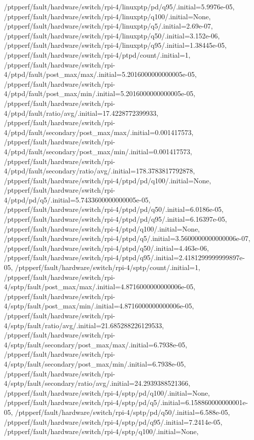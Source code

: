 {    /ptpperf/fault/hardware/switch/rpi-4/linuxptp/pd/q95/.initial=5.9976e-05,
    /ptpperf/fault/hardware/switch/rpi-4/linuxptp/q100/.initial=None,
    /ptpperf/fault/hardware/switch/rpi-4/linuxptp/q5/.initial=2.69e-07,
    /ptpperf/fault/hardware/switch/rpi-4/linuxptp/q50/.initial=3.152e-06,
    /ptpperf/fault/hardware/switch/rpi-4/linuxptp/q95/.initial=1.38445e-05,
    /ptpperf/fault/hardware/switch/rpi-4/ptpd/count/.initial=1,
    /ptpperf/fault/hardware/switch/rpi-4/ptpd/fault/post_max/max/.initial=5.2016000000000005e-05,
    /ptpperf/fault/hardware/switch/rpi-4/ptpd/fault/post_max/min/.initial=5.2016000000000005e-05,
    /ptpperf/fault/hardware/switch/rpi-4/ptpd/fault/ratio/avg/.initial=17.4228772399933,
    /ptpperf/fault/hardware/switch/rpi-4/ptpd/fault/secondary/post_max/max/.initial=0.001417573,
    /ptpperf/fault/hardware/switch/rpi-4/ptpd/fault/secondary/post_max/min/.initial=0.001417573,
    /ptpperf/fault/hardware/switch/rpi-4/ptpd/fault/secondary/ratio/avg/.initial=178.3783817792878,
    /ptpperf/fault/hardware/switch/rpi-4/ptpd/pd/q100/.initial=None,
    /ptpperf/fault/hardware/switch/rpi-4/ptpd/pd/q5/.initial=5.7433600000000005e-05,
    /ptpperf/fault/hardware/switch/rpi-4/ptpd/pd/q50/.initial=6.0186e-05,
    /ptpperf/fault/hardware/switch/rpi-4/ptpd/pd/q95/.initial=6.16397e-05,
    /ptpperf/fault/hardware/switch/rpi-4/ptpd/q100/.initial=None,
    /ptpperf/fault/hardware/switch/rpi-4/ptpd/q5/.initial=3.5600000000000006e-07,
    /ptpperf/fault/hardware/switch/rpi-4/ptpd/q50/.initial=4.463e-06,
    /ptpperf/fault/hardware/switch/rpi-4/ptpd/q95/.initial=2.4181299999999897e-05,
    /ptpperf/fault/hardware/switch/rpi-4/sptp/count/.initial=1,
    /ptpperf/fault/hardware/switch/rpi-4/sptp/fault/post_max/max/.initial=4.8716000000000006e-05,
    /ptpperf/fault/hardware/switch/rpi-4/sptp/fault/post_max/min/.initial=4.8716000000000006e-05,
    /ptpperf/fault/hardware/switch/rpi-4/sptp/fault/ratio/avg/.initial=21.685288226129533,
    /ptpperf/fault/hardware/switch/rpi-4/sptp/fault/secondary/post_max/max/.initial=6.7938e-05,
    /ptpperf/fault/hardware/switch/rpi-4/sptp/fault/secondary/post_max/min/.initial=6.7938e-05,
    /ptpperf/fault/hardware/switch/rpi-4/sptp/fault/secondary/ratio/avg/.initial=24.2939388521366,
    /ptpperf/fault/hardware/switch/rpi-4/sptp/pd/q100/.initial=None,
    /ptpperf/fault/hardware/switch/rpi-4/sptp/pd/q5/.initial=6.158860000000001e-05,
    /ptpperf/fault/hardware/switch/rpi-4/sptp/pd/q50/.initial=6.588e-05,
    /ptpperf/fault/hardware/switch/rpi-4/sptp/pd/q95/.initial=7.2414e-05,
    /ptpperf/fault/hardware/switch/rpi-4/sptp/q100/.initial=None,
}
